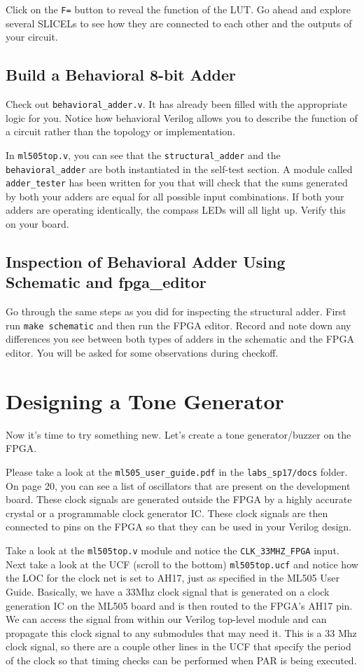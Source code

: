 \documentclass[11pt]{article}
\begin{document}
Click on the \verb|F=| button to reveal the function of the LUT. Go ahead and explore several SLICELs to see how they are connected to each other and the outputs of your circuit.

\subsection{Build a Behavioral 8-bit Adder}

Check out \verb|behavioral_adder.v|. It has already been filled with the appropriate logic for you. Notice how behavioral Verilog allows you to describe the function of a circuit rather than the topology or implementation.

In \verb|ml505top.v|, you can see that the \verb|structural_adder| and the \verb|behavioral_adder| are both instantiated in the self-test section. A module called \verb|adder_tester| has been written for you that will check that the sums generated by both your adders are equal for all possible input combinations. If both your adders are operating identically, the compass LEDs will all light up. Verify this on your board.

\subsection{Inspection of Behavioral Adder Using Schematic and fpga\_editor}

Go through the same steps as you did for inspecting the structural adder. First run \verb|make schematic| and then run the FPGA editor. Record and note down any differences you see between both types of adders in the schematic and the FPGA editor. You will be asked for some observations during checkoff.

\section{Designing a Tone Generator}
Now it's time to try something new. Let's create a tone generator/buzzer on the FPGA.

Please take a look at the \verb|ml505_user_guide.pdf| in the \verb|labs_sp17/docs| folder. On page 20, you can see a list of oscillators that are present on the development board. These clock signals are generated outside the FPGA by a highly accurate crystal or a programmable clock generator IC. These clock signals are then connected to pins on the FPGA so that they can be used in your Verilog design.

Take a look at the \verb|ml505top.v| module and notice the \verb|CLK_33MHZ_FPGA| input. Next take a look at the UCF (scroll to the bottom) \verb|ml505top.ucf| and notice how the LOC for the clock net is set to AH17, just as specified in the ML505 User Guide. Basically, we have a 33Mhz clock signal that is generated on a clock generation IC on the ML505 board and is then routed to the FPGA's AH17 pin. We can access the signal from within our Verilog top-level module and can propagate this clock signal to any submodules that may need it. This is a 33 Mhz clock signal, so there are a couple other lines in the UCF that specify the period of the clock so that timing checks can be performed when PAR is being executed.
\end{document}
